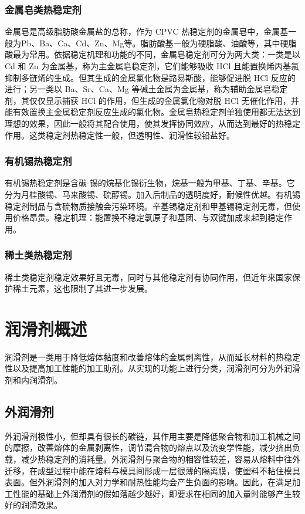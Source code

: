 \subsubsection{金属皂类热稳定剂}
金属皂是高级脂肪酸金属盐的总称，作为 CPVC 热稳定剂的金属皂中，金属基一般为Pb、Ba、Ca、Cd、Zn、Mg等。脂肪酸基一般为硬脂酸、油酸等，其中硬脂酸最为常用。依据稳定机理和功能的不同，金属皂稳定剂可分为两大类：一类是以 Cd 和 Zn 为金属基，称为主金属皂稳定剂，它们能够吸收 HCl 且能置换烯丙基氯抑制多链烯的生成。但其生成的金属氯化物是路易斯酸，能够促进脱 HCl 反应的进行；另一类以 Ba、Sr、Ca、Mg 等碱土金属为金属基，称为辅助金属皂稳定剂，其仅仅显示捕获 HCl 的作用，但生成的金属氯化物对脱 HCl 无催化作用，并能有效置换主金属稳定剂反应生成的氯化物。金属皂热稳定剂单独使用都无法达到理想的效果，因此一般将其配合使用，使其发挥协同效应，从而达到最好的热稳定作用。这类稳定剂热稳定性一般，但透明性、润滑性较铅盐好。

\subsubsection{有机锡热稳定剂}
有机锡热稳定剂是含碳-锡的烷基化锡衍生物，烷基一般为甲基、丁基、辛基。它分为月桂酸锡、马来酸锡、硫醇锡。加入后制品的透明度好，耐候性优越。有机锡稳定剂制品与含硫物质接触会污染环境。辛基锡稳定剂和甲基锡稳定剂无毒，但使用价格昂贵。稳定机理：能置换不稳定氯原子和基团、与双键加成来起到稳定作用。

\subsubsection{稀土类热稳定剂}
稀土类稳定剂稳定效果好且无毒，同时与其他稳定剂有协同作用，但近年来国家保护稀土元素，这也限制了其进一步发展。


\section{润滑剂概述\cite{2}}
润滑剂是一类用于降低熔体黏度和改善熔体的金属剥离性，从而延长材料的热稳定性以及提高加工性能的加工助剂。从实现的功能上进行分类，润滑剂可分为外润滑剂和内润滑剂。

\subsection{外润滑剂}
外润滑剂极性小，但却具有很长的碳链，其作用主要是降低聚合物和加工机械之间的摩擦，改善熔体的金属剥离性，调节混合物的熔点以及流变学性能，减少挤出负载，减少热稳定剂的消耗量。外润滑剂与聚合物的相容性较差，容易从熔料中往外迁移，在成型过程中能在熔料与模具间形成一层很薄的隔离膜，使塑料不粘住模具表面。但外润滑剂的加入对力学和耐热性能均会产生负面的影响。因此，在满足加工性能的基础上外润滑剂的假如落越少越好，即要求在相同的加入量时能够产生较好的润滑效果。

